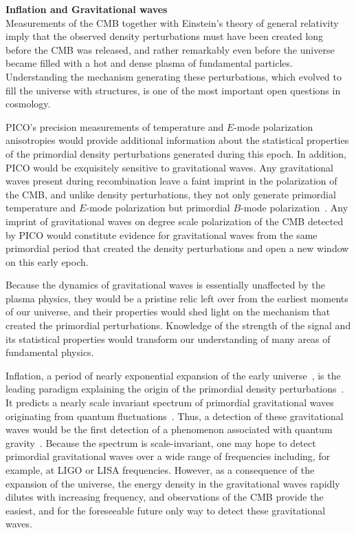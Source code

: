 \documentclass[PICOReport.tex]{subfiles}
\begin{document}
{\bf Inflation and Gravitational waves} \\ %
Measurements of the \ac{CMB} together with Einstein's theory of general relativity imply that the observed density perturbations must have been created long before the \ac{CMB} was released, and rather remarkably even before the universe became filled with a hot and dense plasma of fundamental particles. Understanding the mechanism generating these perturbations, which evolved to fill the universe with structures, is one of the most important open questions in cosmology.

PICO's precision measurements of temperature and $E$-mode polarization anisotropies would provide additional information about the statistical properties of the primordial density perturbations generated during this epoch. In addition, PICO would be exquisitely sensitive to gravitational waves. Any gravitational waves present during recombination leave a faint imprint in the polarization of the CMB, and unlike density perturbations, they not only generate primordial temperature and $E$-mode polarization but primordial $B$-mode polarization~\cite{Seljak:1996gy,Kamionkowski:1996zd}. Any imprint of gravitational waves on degree scale polarization of the \ac{CMB} detected by PICO would constitute evidence for gravitational waves from the same primordial period that created the density perturbations and open a new window on this early epoch.

Because the dynamics of gravitational waves is essentially unaffected by the plasma physics, they would be a pristine relic left over from the earliest moments of our universe, and their properties would shed light on the mechanism that created the primordial perturbations. 
Knowledge of the strength of the signal and its statistical properties would transform our understanding of many areas of fundamental physics. 


Inflation, a period of nearly exponential expansion of the early universe~\cite{Guth:1980zm,Linde:1981mu,Albrecht:1982wi,Starobinsky:1980te}, is the leading paradigm explaining the origin of the primordial density perturbations~\cite{Mukhanov:1981xt,Guth:1982ec,Hawking:1982cz,Starobinsky:1982ee,Bardeen:1983qw}. It predicts a nearly scale invariant spectrum of primordial gravitational waves originating from quantum fluctuations~\cite{Starobinsky:1979ty}. Thus, a detection of these gravitational waves would be the first detection of a phenomenon associated with quantum gravity~\cite{Krauss:2013pha}. Because the spectrum is scale-invariant, one may hope to detect primordial gravitational waves over a wide range of frequencies including, for example, at LIGO or LISA frequencies. 
However, as a consequence of the expansion of the universe, the energy density in the gravitational waves rapidly dilutes with increasing frequency, and observations of the CMB provide the easiest, and for the foreseeable future only way to detect these gravitational waves. 
\end{document}
